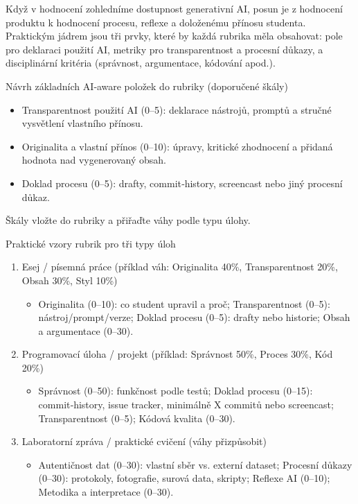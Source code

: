 Když v hodnocení zohledníme dostupnost generativní AI, posun je z hodnocení produktu k hodnocení procesu, reflexe a doloženému přínosu studenta. Praktickým jádrem jsou tři prvky, které by každá rubrika měla obsahovat: pole pro deklaraci použití AI, metriky pro transparentnost a procesní důkazy, a disciplinární kritéria (správnost, argumentace, kódování apod.).

\medskip

Návrh základních AI‑aware položek do rubriky (doporučené škály)
\begin{itemize}
\item Transparentnost použití AI (0–5): deklarace nástrojů, promptů a stručné vysvětlení vlastního přínosu.
\item Originalita a vlastní přínos (0–10): úpravy, kritické zhodnocení a přidaná hodnota nad vygenerovaný obsah.
\item Doklad procesu (0–5): drafty, commit‑history, screencast nebo jiný procesní důkaz.
\end{itemize}

Škály vložte do rubriky a přiřaďte váhy podle typu úlohy.

\medskip

Praktické vzory rubrik pro tři typy úloh
\begin{enumerate}
\item Esej / písemná práce (příklad váh: Originalita 40\%, Transparentnost 20\%, Obsah 30\%, Styl 10\%)
  \begin{itemize}
  \item Originalita (0–10): co student upravil a proč; Transparentnost (0–5): nástroj/prompt/verze; Doklad procesu (0–5): drafty nebo historie; Obsah a argumentace (0–30).
  \end{itemize}

\item Programovací úloha / projekt (příklad: Správnost 50\%, Proces 30\%, Kód 20\%)
  \begin{itemize}
  \item Správnost (0–50): funkčnost podle testů; Doklad procesu (0–15): commit‑history, issue tracker, minimálně X commitů nebo screencast; Transparentnost (0–5); Kódová kvalita (0–30).
  \end{itemize}

\item Laboratorní zpráva / praktické cvičení (váhy přizpůsobit)
  \begin{itemize}
  \item Autentičnost dat (0–30): vlastní sběr vs. externí dataset; Procesní důkazy (0–30): protokoly, fotografie, surová data, skripty; Reflexe AI (0–10); Metodika a interpretace (0–30).
  \end{itemize}
\end{enumerate}

